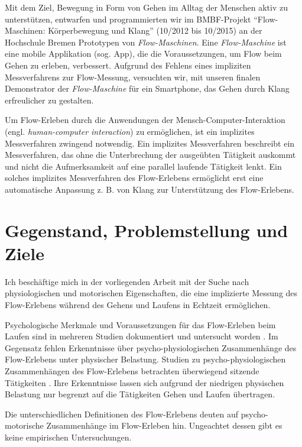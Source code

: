 Mit dem Ziel, Bewegung in Form von Gehen im Alltag der Menschen aktiv zu unterstützen, entwarfen und programmierten wir im \acs{BMBF}-Projekt "`Flow-Maschinen: Körperbewegung und Klang"' (10/2012 bis 10/2015) an der Hochschule Bremen Prototypen von \emph{Flow-Maschinen}. Eine \emph{Flow-Maschine} ist eine mobile Applikation (sog. App), die die Voraussetzungen, um Flow beim Gehen zu erleben, verbessert. Aufgrund des Fehlens eines impliziten Messverfahrens zur Flow-Messung, versuchten wir, mit unseren finalen Demonstrator der \emph{Flow-Maschine} für ein Smartphone, das Gehen durch Klang erfreulicher zu gestalten.

Um Flow-Erleben durch die Anwendungen der Mensch-Computer-Interaktion (engl. \emph{human-computer interaction}) zu ermöglichen, ist ein implizites Messverfahren zwingend notwendig. Ein implizites Messverfahren beschreibt ein Messverfahren, das ohne die Unterbrechung der ausgeübten Tätigkeit auskommt und nicht die Aufmerksamkeit auf eine parallel laufende Tätigkeit lenkt. Ein solches implizites Messverfahren des Flow-Erlebens ermöglicht erst eine automatische Anpassung z. B. von Klang zur Unterstützung des Flow-Erlebens.

\section{Gegenstand, Problemstellung und Ziele}

Ich beschäftige mich in der vorliegenden Arbeit mit der Suche nach physiologischen und motorischen Eigenschaften, die eine implizierte Messung des Flow-Erlebens während des Gehens und Laufens in Echtzeit ermöglichen.

Psychologische Merkmale und Voraussetzungen für das Flow-Erleben beim Laufen sind in mehreren Studien dokumentiert und untersucht worden \citep{Stoll2005, Reinhardt2006, Schuler2009, Jimenez-Torres2013}. Im Gegensatz fehlen Erkenntnisse über psycho-physiologischen Zusammenhänge des Flow-Erlebens unter physischer Belastung. Studien zu psycho-physiologischen Zusammenhängen des Flow-Erlebens betrachten überwiegend sitzende Tätigkeiten \citep{deManzano2010, Keller2011, Peifer2014, Tozman2015}. Ihre Erkenntnisse lassen sich aufgrund der niedrigen physischen Belastung nur begrenzt auf die Tätigkeiten Gehen und Laufen übertragen.

Die unterschiedlichen Definitionen des Flow-Erlebens deuten auf psycho-motorische Zusammenhänge im Flow-Erleben hin. Ungeachtet dessen gibt es keine empirischen Untersuchungen.

